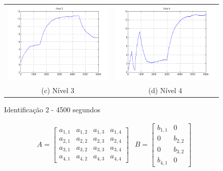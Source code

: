 \begin{itemize}
\begin{figure}[H]
\begin{tabular}{cc}
		\includegraphics[height=0.15\paperheight,keepaspectratio]{img/sim2_h3.png} &
		\includegraphics[height=0.15\paperheight,keepaspectratio]{img/sim2_h4.png} \\
		(c) Nível 3 &
		(d) Nível 4
	\end{tabular}
	\caption{\label{imgID_45Results} Identificação 2 - 4500 segundos}
\end{figure}

\begin{align}
	& A =
	\begin{bmatrix}
		a_{1,1} & a_{1,2} & a_{1,3} & a_{1,4} \\
		a_{2,1} & a_{2,2} & a_{2,3} & a_{2,4} \\
		a_{3,1} & a_{3,2} & a_{3,3} & a_{3,4} \\
		a_{4,1} & a_{4,2} & a_{4,3} & a_{4,4}
	\end{bmatrix}
	& B =
	\begin{bmatrix}
		b_{1,1} & 0 \\
		0 & b_{2,2} \\
		0 & b_{3,2} \\
		b_{4,1} & 0
	\end{bmatrix}
\end{align}


\end{itemize}
